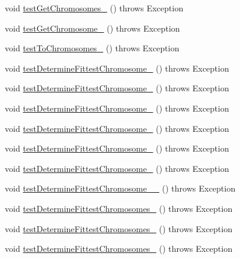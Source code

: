 \begin{DoxyCompactItemize}
\item 
void \hyperlink{classorg_1_1jgap_1_1_population_test_a3e4f14e29b5505de56ea481973cd735d}{test\-Get\-Chromosomes\-\_} ()  throws Exception 
\item 
void \hyperlink{classorg_1_1jgap_1_1_population_test_a59bca41d137907350efc7af6f4322b21}{test\-Get\-Chromosome\-\_} ()  throws Exception 
\item 
void \hyperlink{classorg_1_1jgap_1_1_population_test_aebe0932ddcee66c6cf80e8d0ff359882}{test\-To\-Chromosomes\-\_} ()  throws Exception 
\item 
void \hyperlink{classorg_1_1jgap_1_1_population_test_a41a5bc65d80f2d2f2922e8fc8588fa1f}{test\-Determine\-Fittest\-Chromosome\-\_} ()  throws Exception 
\item 
void \hyperlink{classorg_1_1jgap_1_1_population_test_a87804f5ac0de151805da87131faa134a}{test\-Determine\-Fittest\-Chromosome\-\_} ()  throws Exception 
\item 
void \hyperlink{classorg_1_1jgap_1_1_population_test_a420f7afaa423e4f3d4eb6104551f8782}{test\-Determine\-Fittest\-Chromosome\-\_} ()  throws Exception 
\item 
void \hyperlink{classorg_1_1jgap_1_1_population_test_a837d2d2071092bdf15b65e2eb5080e41}{test\-Determine\-Fittest\-Chromosome\-\_} ()  throws Exception 
\item 
void \hyperlink{classorg_1_1jgap_1_1_population_test_abf6d6d266af7f6d21ba920fd74b3db58}{test\-Determine\-Fittest\-Chromosome\-\_} ()  throws Exception 
\item 
void \hyperlink{classorg_1_1jgap_1_1_population_test_a1fb1c4a55db7cf499e25bcd454d38c3e}{test\-Determine\-Fittest\-Chromosome\-\_} ()  throws Exception 
\item 
void \hyperlink{classorg_1_1jgap_1_1_population_test_a53fb9b6fcf79568d3103ea114e578e68}{test\-Determine\-Fittest\-Chromosome\-\_\-\_} ()  throws Exception 
\item 
void \hyperlink{classorg_1_1jgap_1_1_population_test_ab6124e38439ae0522c18fcc8aae9a810}{test\-Determine\-Fittest\-Chromosomes\-\_} ()  throws Exception 
\item 
void \hyperlink{classorg_1_1jgap_1_1_population_test_ac7723faafb80bd6eee02492f2ab34bdf}{test\-Determine\-Fittest\-Chromosomes\-\_} ()  throws Exception 
\item 
void \hyperlink{classorg_1_1jgap_1_1_population_test_acfb45d91bed46708664fc0f698e9b7c7}{test\-Determine\-Fittest\-Chromosomes\-\_} ()  throws Exception 
\item 

\end{DoxyCompactItemize}
